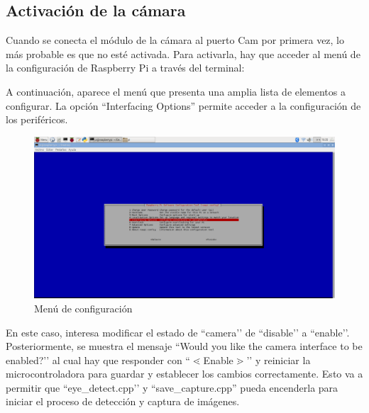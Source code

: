 \subsection{Activación de la cámara} \label{s4_2_2}

Cuando se conecta el módulo de la cámara al puerto Cam por primera vez, lo más probable es que no esté activada. Para activarla, hay que acceder al menú de la configuración de Raspberry Pi a través del terminal:


A continuación, aparece el menú que presenta una amplia lista de elementos a configurar. La opción ``Interfacing Options'' permite acceder a la configuración de los periféricos. 

    \begin{figure}
    \centering
    \includegraphics[scale = 0.25]{capitulo_04/figuras_dir/actp1.jpg}
    \caption{Menú de configuración}
    \end{figure}

En este caso, interesa modificar el estado de ``camera’’ de ``disable’’ a ``enable’’. Posteriormente, se muestra el mensaje ``Would you like the camera interface to be enabled?’’ al cual hay que responder con ``$\lessdot$Enable$\gtrdot$’’ y reiniciar la microcontroladora para guardar y establecer los cambios correctamente. Esto va a permitir que ``eye\_detect.cpp’’ y ``save\_capture.cpp'' pueda encenderla para iniciar el proceso de detección y captura de imágenes.

